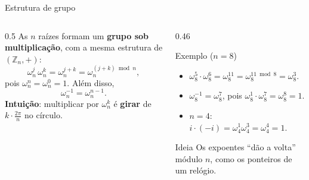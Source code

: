 \documentclass[aspectratio=169,10pt]{beamer}
\newcommand{\w}[2][n]{\omega_{#1}^{#2}}       %
\begin{document}
\begin{frame}{Estrutura de grupo}
  \begin{columns}[T]
    \begin{column}{0.5\textwidth}
      As $n$ raízes formam um \textbf{grupo sob multiplicação}, com a mesma estrutura
      de $(\mathbb{Z}_n, +)$:
      \[
        \w{j}\,\w{k} = \w{j+k} = \w{(j+k) \bmod n},
      \]
      pois $\w{n} = \w{0} = 1$. Além disso,
      \[
        \w{-1} = \w{n-1}.
      \]
      \textbf{Intuição}: multiplicar por $\w{k}$ é \textbf{girar} de $k\cdot\frac{2\pi}{n}$ no círculo.
    \end{column}
    \begin{column}{0.46\textwidth}
      \begin{exampleblock}{Exemplo ($n=8$)}
        \begin{itemize}
          \item $\w[8]{5}\cdot\w[8]{6} = \w[8]{11} = \w[8]{11 \bmod 8} = \w[8]{3}$.
          \item $\w[8]{-1} = \w[8]{7}$, pois $\w[8]{1}\cdot\w[8]{7} = \w[8]{8} = 1$.
          \item $n=4$: $i \cdot (-i) = \w[4]{1}\w[4]{3} = \w[4]{4} = 1$.
        \end{itemize}
      \end{exampleblock}
      \begin{block}{Ideia}
        Os expoentes ``dão a volta'' módulo $n$, como os ponteiros de um relógio.
      \end{block}
    \end{column}
  \end{columns}
\end{frame}
\end{document}
